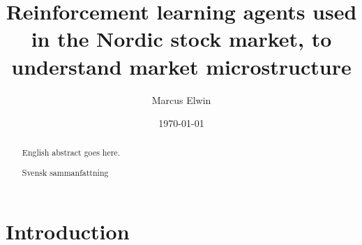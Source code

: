 \documentclass{kththesis}
\title{Reinforcement learning agents used in the Nordic stock market, to understand market microstructure}
\author{Marcus Elwin}
\date{\today}
\theoremstyle{definition}
\begin{document}
\frontmatter

\titlepage

\begin{abstract}
  English abstract goes here.

\end{abstract}


\begin{otherlanguage}{swedish}
  \begin{abstract}
    Svensk sammanfattning
  \end{abstract}
\end{otherlanguage}


\tableofcontents

\listoffigures
 
\listoftables

\lstlistoflistings


\mainmatter


\chapter{Introduction}\label{ch:1}

\end{document}
